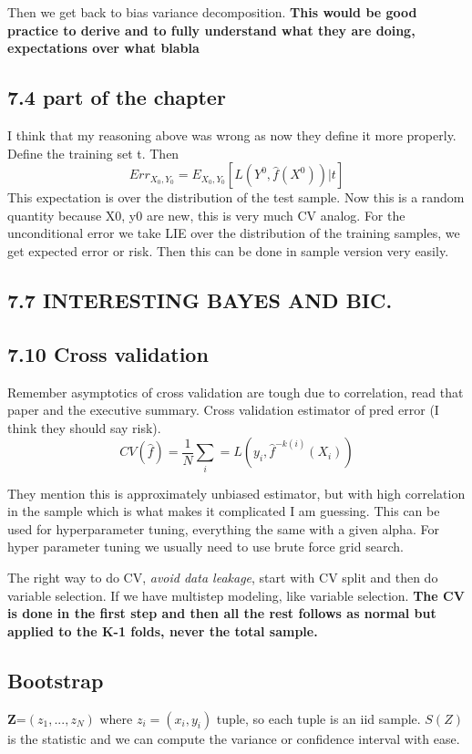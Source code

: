 \documentclass{article}
\begin{document}
Then we get back to bias variance decomposition. 
\textbf{This would be good practice to derive and to fully understand what they are doing, expectations over what blabla}

\subsection*{7.4 part of the chapter}

I think that my reasoning above was wrong as now they define it more properly.
Define the training set t.
Then $$Err_{X_0,Y_0}= E_{X_0,Y_0}[L(Y^0,\hat{f}(X^0))|t]$$
This expectation is over the distribution of the test sample. Now this is a random quantity because X0, y0 are new, this is very much CV analog.
For the unconditional error we take LIE over the distribution of the training samples, we get expected error or risk. Then this can be done in sample version very easily.
\subsection*{7.7 INTERESTING BAYES AND BIC.}


\subsection*{7.10 Cross validation}
Remember asymptotics of cross validation are tough due to correlation, read that paper and the executive summary.
Cross validation estimator of pred error (I think they should say risk). $$CV(\hat{f})=\frac{1}{N}\sum_i=L(y_i,\hat{f}^{-k(i)}(X_i))$$

They mention this is approximately unbiased estimator, but with high correlation in the sample which is what makes it complicated I am guessing.
This can be used for hyperparameter tuning, everything the same with a given alpha. 
For hyper parameter tuning we usually need to use brute force grid search.

The right way to do CV, \textit{avoid data leakage}, start with CV split and then do variable selection. 
If we have multistep modeling, like variable selection. \textbf{The CV is done in the first step and then all the rest follows as normal but applied to the K-1 folds, never the total sample.}

\subsection*{Bootstrap}
\textbf{Z}=$(z_1,...,z_N)$ where $z_i = (x_i,y_i)$ tuple, so each tuple is an iid sample.
$S(Z) $ is the statistic and we can compute the variance or confidence interval with ease.
\end{document}
